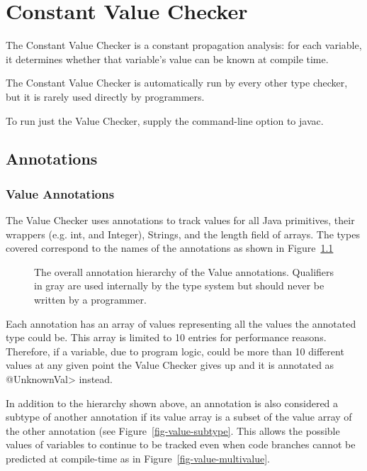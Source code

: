 \htmlhr
\chapter{Constant Value Checker\label{value-checker}}

The Constant Value Checker is a constant propagation analysis: for
each variable, it determines whether that variable's value can be
known at compile time.


The Constant Value Checker is automatically run by every other type
checker, but it is rarely used directly by programmers.

To run just the Value Checker, supply the
command-line option to javac.

\section{Annotations}
\subsection{Value Annotations}

The Value Checker uses annotations to track values for all Java
primitives, their wrappers (e.g. int, and Integer), Strings, and the
length field of arrays. The types covered correspond to the names of
the annotations as shown in Figure~\ref{fig-value-hierarchy}

\begin{figure}
\caption{The overall annotation hierarchy of the Value
annotations. Qualifiers in gray are used
internally by the type system but should never be written by a
programmer.}
\label{fig-value-hierarchy}
\end{figure}

Each annotation has an array of values representing all the values the
annotated type could be. This array is limited to 10 entries for
performance reasons. Therefore, if a variable, due to program logic,
could be more than 10 different values at any given point the Value
Checker gives up and it is annotated as \<@UnknownVal> instead.

In addition to the hierarchy shown above, an annotation is also
considered a subtype of another annotation if its value array is a
subset of the value array of the other annotation (see
Figure~\ref{fig-value-subtype}. This allows the possible values of
variables to continue to be tracked even when code branches cannot be
predicted at compile-time as in Figure~\ref{fig-value-multivalue}.


